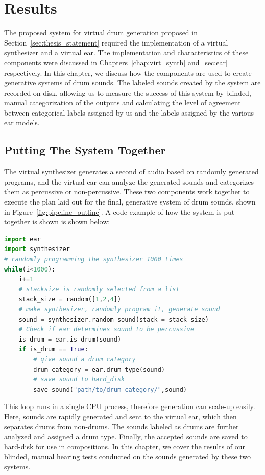 \documentclass[\main/thesis.tex]{subfiles}
\begin{document}
\chapter{Results}
The proposed system for virtual drum generation proposed in Section~\ref{sec:thesis_statement} required the implementation of a virtual synthesizer and a virtual ear. The implementation and characteristics of these components were discussed in Chapters~\ref{chap:virt_synth} and~\ref{sec:ear} respectively. In this chapter, we discuss how the components are used to create generative systems of drum sounds. The labeled sounds created by the system are recorded on disk, allowing us to measure the success of this system by blinded, manual categorization of the outputs and calculating the level of agreement between categorical labels assigned by us and the labels assigned by the various ear models. 

\newcommand{\decfirst}{\textit{Decision.1}}
\newcommand{\decsecond}{\textit{Decision.2}}
\section{Putting The System Together}
 The virtual synthesizer generates a second of audio based on randomly generated programs, and the virtual ear can analyze the generated sounds and categorizes them as percussive or non-percussive. These two components work together to execute the plan laid out for the final, generative system of drum sounds, shown in Figure~\ref{fig:pipeline_outline}. A code example of how the system is put together is shown is shown below:
\begin{lstlisting}[language=Python]
import ear
import synthesizer
# randomly programming the synthesizer 1000 times 
while(i<1000):
    i+=1
    # stacksize is randomly selected from a list
    stack_size = random([1,2,4])
    # make synthesizer, randomly program it, generate sound
    sound = synthesizer.random_sound(stack = stack_size)
    # Check if ear determines sound to be percussive
    is_drum = ear.is_drum(sound)
    if is_drum == True:
        # give sound a drum category 
        drum_category = ear.drum_type(sound) 
        # save sound to hard_disk
        save_sound("path/to/drum_category/",sound) 
\end{lstlisting}
This loop runs in a single CPU process, therefore generation can scale-up easily. Here, sounds are rapidly generated and sent to the virtual ear, which then separates drums from non-drums. The sounds labeled as drums are further analyzed and assigned a drum type. Finally, the accepted sounds are saved to hard-disk for use in compositions. In this chapter, we cover the results of our blinded, manual hearing tests conducted on the sounds generated by these two systems.
\end{document}

